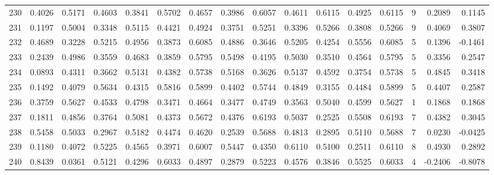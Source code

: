 \begin{tabular}{lrrrrrrrrrrrrrrr}
230 &      0.4026 &  0.5171 &  0.4603 &  0.3841 &  0.5702 &  0.4657 &  0.3986 &  0.6057 &  0.4611 &  0.6115 &   0.4925 &     0.6115 &      9 &                    0.2089 &                     0.1145 \\
231 &      0.1197 &  0.5004 &  0.3348 &  0.5115 &  0.4421 &  0.4924 &  0.3751 &  0.5251 &  0.3396 &  0.5266 &   0.3808 &     0.5266 &      9 &                    0.4069 &                     0.3807 \\
232 &      0.4689 &  0.3228 &  0.5215 &  0.4956 &  0.3873 &  0.6085 &  0.4886 &  0.3646 &  0.5205 &  0.4254 &   0.5556 &     0.6085 &      5 &                    0.1396 &                    -0.1461 \\
233 &      0.2439 &  0.4986 &  0.3559 &  0.4683 &  0.3859 &  0.5795 &  0.5498 &  0.4195 &  0.5030 &  0.3510 &   0.4564 &     0.5795 &      5 &                    0.3356 &                     0.2547 \\
234 &      0.0893 &  0.4311 &  0.3662 &  0.5131 &  0.4382 &  0.5738 &  0.5168 &  0.3626 &  0.5137 &  0.4592 &   0.3754 &     0.5738 &      5 &                    0.4845 &                     0.3418 \\
235 &      0.1492 &  0.4079 &  0.5634 &  0.4315 &  0.5816 &  0.5899 &  0.4402 &  0.5744 &  0.4849 &  0.3155 &   0.4484 &     0.5899 &      5 &                    0.4407 &                     0.2587 \\
236 &      0.3759 &  0.5627 &  0.4533 &  0.4798 &  0.3471 &  0.4664 &  0.3477 &  0.4749 &  0.3563 &  0.5040 &   0.4599 &     0.5627 &      1 &                    0.1868 &                     0.1868 \\
237 &      0.1811 &  0.4856 &  0.3764 &  0.5081 &  0.4373 &  0.5672 &  0.4376 &  0.6193 &  0.5037 &  0.2525 &   0.5508 &     0.6193 &      7 &                    0.4382 &                     0.3045 \\
238 &      0.5458 &  0.5033 &  0.2967 &  0.5182 &  0.4474 &  0.4620 &  0.2539 &  0.5688 &  0.4813 &  0.2895 &   0.5110 &     0.5688 &      7 &                    0.0230 &                    -0.0425 \\
239 &      0.1180 &  0.4072 &  0.5225 &  0.4565 &  0.3971 &  0.6007 &  0.5447 &  0.4350 &  0.6110 &  0.5100 &   0.2511 &     0.6110 &      8 &                    0.4930 &                     0.2892 \\
240 &      0.8439 &  0.0361 &  0.5121 &  0.4296 &  0.6033 &  0.4897 &  0.2879 &  0.5223 &  0.4576 &  0.3846 &   0.5525 &     0.6033 &      4 &                   -0.2406 &                    -0.8078 \\

\end{tabular}
